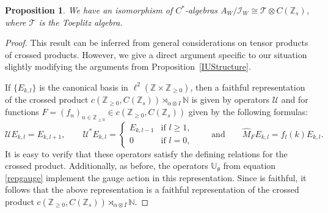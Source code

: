 \documentclass[pdftex]{sigma}
\newcommand{\N}{{\mathbb N}}
\newcommand{\Z}{{\mathbb Z}}
\numberwithin{equation}{section}
\newtheorem{Proposition}[Theorem]{Proposition}
 { \theoremstyle{definition}
\newtheorem{Definition}[Theorem]{Definition}
\newtheorem{Note}[Theorem]{Note}
\newtheorem{Example}[Theorem]{Example}
\newtheorem{Remark}[Theorem]{Remark} }
\begin{document}
\begin{Proposition}\label{WAlgebraQuotient}
We have an isomorphism of $C^*$-algebras
$A_W/\mathcal{I}_W\cong \mathcal{T}\otimes C(\Z_s)$,
where $\mathcal{T}$ is the Toeplitz algebra.
\end{Proposition}
\begin{proof} This result can be inferred from general considerations on tensor products of crossed products. However, we give a direct argument specific to our situation slightly modifying the arguments from Proposition~\ref{IUStructure}.

If $\{E_{k,l}\}$ is the canonical basis in $\ell^2(\Z\times\Z_{\ge0})$, then a faithful representation of the crossed product $c(\Z_{\ge0}, C(\Z_s))\rtimes_{\alpha\otimes I}\N$ is given by operators $\mathcal{U}$ and  for functions $F=(f_n)_{n\in \Z_{\ge0}}\in c(\Z_{\ge0}, C(\Z_s))$ given by the following formulas:
\begin{equation*}
\mathcal{U}E_{k,l}=E_{k, l+1} ,\qquad \mathcal{U}^*E_{k,l} =
\begin{cases}
E_{k, l-1} &\textrm{if }l\ge1,\\
0 &\textrm{if }l=0,
\end{cases}\qquad\text{and}\qquad \widehat M_FE_{k,l} = f_l(k)E_{k,l} .
\end{equation*}
It is easy to verify that these operators satisfy the defining relations for the crossed product. Additionally, as before, the operators $\mathbb{U}_\theta$ from equation \eqref{repgauge} implement the gauge action in this representation. Since  is faithful, it follows that the above representation is a faithful representation of the crossed product $c(\Z_{\ge0}, C(\Z_s))\rtimes_{\alpha\otimes I}\N$.


\end{proof}
\end{document}
